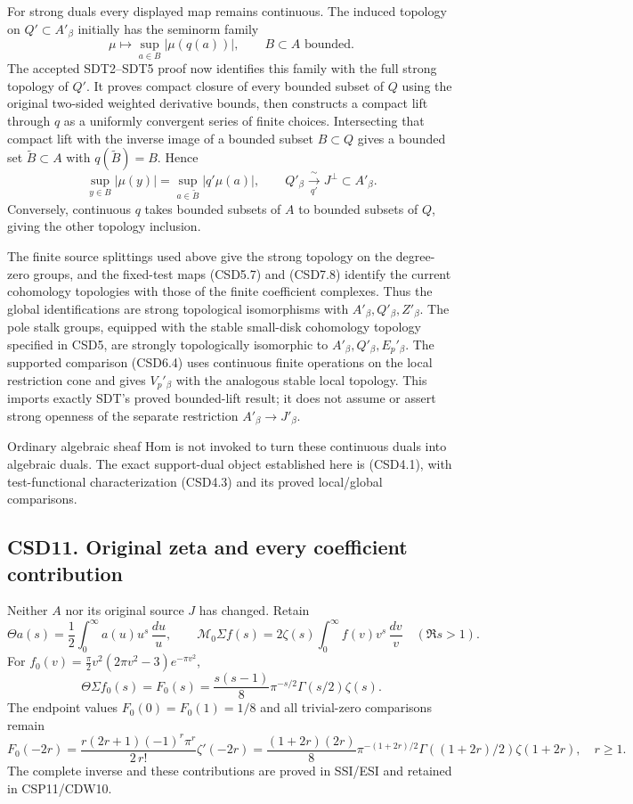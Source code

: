 For strong duals every displayed map remains continuous. The induced
topology on \(Q'\subset A'_\beta\) initially has the seminorm family \[
\mu\longmapsto\sup_{a\in B}|\mu(q(a))|,
\qquad B\subset A\text{ bounded}.
\tag{CSD10.1}
\] The accepted SDT2--SDT5 proof now identifies this family with the
full strong topology of \(Q'\). It proves compact closure of every
bounded subset of \(Q\) using the original two-sided weighted derivative
bounds, then constructs a compact lift through \(q\) as a uniformly
convergent series of finite choices. Intersecting that compact lift with
the inverse image of a bounded subset \(B\subset Q\) gives a bounded set
\(\widetilde B\subset A\) with \(q(\widetilde B)=B\). Hence \[
\sup_{y\in B}|\mu(y)|=\sup_{a\in\widetilde B}|q'\mu(a)|,
\qquad
Q'_\beta\xrightarrow[\ q'\ ]{\ \sim\ }J^\perp\subset A'_\beta.
\tag{CSD10.2}
\] Conversely, continuous \(q\) takes bounded subsets of \(A\) to
bounded subsets of \(Q\), giving the other topology inclusion.

The finite source splittings used above give the strong topology on the
degree-zero groups, and the fixed-test maps (CSD5.7) and (CSD7.8)
identify the current cohomology topologies with those of the finite
coefficient complexes. Thus the global identifications are strong
topological isomorphisms with \(A'_\beta,Q'_\beta,Z'_\beta\). The pole
stalk groups, equipped with the stable small-disk cohomology topology
specified in CSD5, are strongly topologically isomorphic to
\(A'_\beta,Q'_\beta,E_p'{}_\beta\). The supported comparison (CSD6.4)
uses continuous finite operations on the local restriction cone and
gives \(V_p'{}_\beta\) with the analogous stable local topology. This
imports exactly SDT's proved bounded-lift result; it does not assume or
assert strong openness of the separate restriction
\(A'_\beta\to J'_\beta\).

Ordinary algebraic sheaf Hom is not invoked to turn these continuous
duals into algebraic duals. The exact support-dual object established
here is (CSD4.1), with test-functional characterization (CSD4.3) and its
proved local/global comparisons.

\subsection{CSD11. Original zeta and every coefficient
contribution}\label{csd11.-original-zeta-and-every-coefficient-contribution}

Neither \(A\) nor its original source \(J\) has changed. Retain \[
\Theta a(s)=\frac12\int_0^\infty a(u)u^s\,\frac{du}{u},\qquad
\mathcal M_0\Sigma f(s)=2\zeta(s)\int_0^\infty f(v)v^s\,\frac{dv}{v}
\quad(\Re s>1).
\tag{CSD11.1}
\] For \(f_0(v)=\frac\pi2v^2(2\pi v^2-3)e^{-\pi v^2}\), \[
\Theta\Sigma f_0(s)=F_0(s)
=\frac{s(s-1)}8\pi^{-s/2}\Gamma(s/2)\zeta(s).
\tag{CSD11.2}
\] The endpoint values \(F_0(0)=F_0(1)=1/8\) and all trivial-zero
comparisons remain \[
F_0(-2r)=\frac{r(2r+1)(-1)^r\pi^r}{2\,r!}\zeta'(-2r)
=\frac{(1+2r)(2r)}8\pi^{-(1+2r)/2}
\Gamma((1+2r)/2)\zeta(1+2r),\quad r\ge1.
\tag{CSD11.3}
\] The complete inverse and these contributions are proved in SSI/ESI
and retained in CSP11/CDW10.

